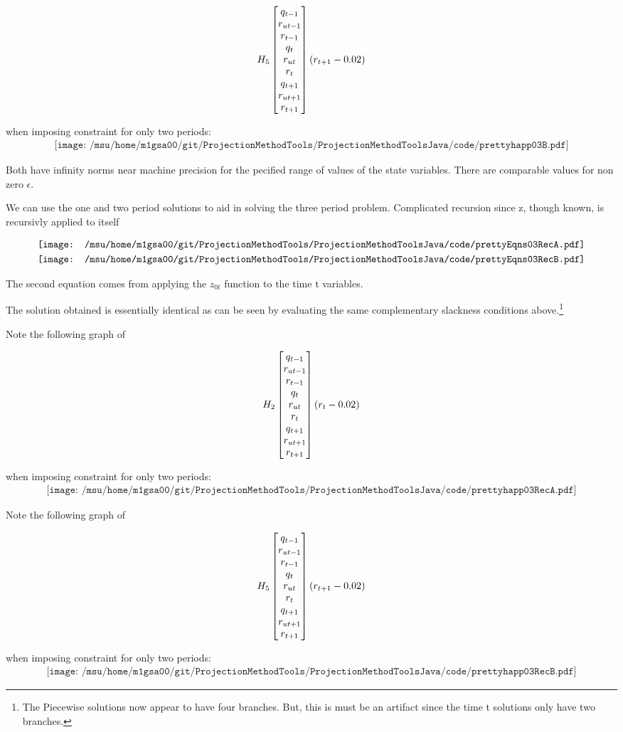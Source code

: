  \begin{gather*}
 H_{5}\begin{bmatrix} q_{t-1}\\r_{ut-1}\\r_{t-1}\\ q_{t}\\r_{ut}\\r_{t}\\ q_{t+1}\\r_{ut+1}\\r_{t+1} \end{bmatrix}( r_{t+1}-0.02)
 \end{gather*}

  when imposing constraint for only two periods:
 \begin{gather*}
 \texttt{[image: /msu/home/m1gsa00/git/ProjectionMethodTools/ProjectionMethodToolsJava/code/prettyhapp03B.pdf]}
 \end{gather*}


Both have infinity norms near machine precision for the pecified range of values of the state variables.  There are comparable values for non zero $\epsilon$.


We can use the one and two period solutions to aid in solving the three period problem.
Complicated recursion since z, though known, is recursivly applied to itself


\begin{gather*}
  \vcenter{\hbox{\texttt{[image: /msu/home/m1gsa00/git/ProjectionMethodTools/ProjectionMethodToolsJava/code/prettyEqns03RecA.pdf]}}}\\
  \vcenter{\hbox{\texttt{[image: /msu/home/m1gsa00/git/ProjectionMethodTools/ProjectionMethodToolsJava/code/prettyEqns03RecB.pdf]}}}\\
\end{gather*}

The second equation comes from applying the $z_{0t}$ function to the time t variables.


The solution obtained is essentially identical as can be seen by evaluating the
same complementary slackness conditions above.\footnote{The Piecewise solutions now appear to have four branches.  But, this
 is must be an artifact since the time t solutions only have two branches.}


 Note the following graph of 

 \begin{gather*}
 H_{2}\begin{bmatrix} q_{t-1}\\r_{ut-1}\\r_{t-1}\\ q_{t}\\r_{ut}\\r_{t}\\ q_{t+1}\\r_{ut+1}\\r_{t+1} \end{bmatrix} ( r_t-0.02)
 \end{gather*}

  when imposing constraint for only two periods:
 \begin{gather*}
 \texttt{[image: /msu/home/m1gsa00/git/ProjectionMethodTools/ProjectionMethodToolsJava/code/prettyhapp03RecA.pdf]}
 \end{gather*}


 Note the following graph of 

 \begin{gather*}
 H_{5}\begin{bmatrix} q_{t-1}\\r_{ut-1}\\r_{t-1}\\ q_{t}\\r_{ut}\\r_{t}\\ q_{t+1}\\r_{ut+1}\\r_{t+1} \end{bmatrix}( r_{t+1}-0.02)
 \end{gather*}

  when imposing constraint for only two periods:
 \begin{gather*}
 \texttt{[image: /msu/home/m1gsa00/git/ProjectionMethodTools/ProjectionMethodToolsJava/code/prettyhapp03RecB.pdf]}
 \end{gather*}

